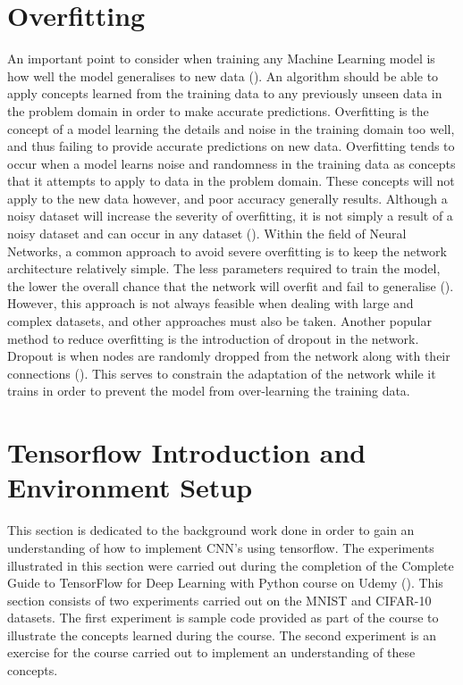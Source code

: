 \documentclass[12pt]{report}
\begin{document}
\section{Overfitting}
\begin{flushleft}
An important point to consider when training any Machine Learning model is how well the model generalises to new data (\cite{domingos2012few}). An algorithm should be able to apply concepts learned from the training data to any previously unseen data in the problem domain in order to make accurate predictions. Overfitting is the concept of a model learning the details and noise in the training domain too well, and thus failing to provide accurate predictions on new data. Overfitting tends to occur when a model learns noise and randomness in the training data as concepts that it attempts to apply to data in the problem domain. These concepts will not apply to the new data however, and poor accuracy generally results. Although a noisy dataset will increase the severity of overfitting, it is not simply a result of a noisy dataset and can occur in any dataset (\cite{domingos2012few}). Within the field of Neural Networks, a common approach to avoid severe overfitting is to keep the network architecture relatively simple. The less parameters required to train the model, the lower the overall chance that the network will overfit and fail to generalise (\cite{o2015introduction}). However, this approach is not always feasible when dealing with large and complex datasets, and other approaches must also be taken. Another popular method to reduce overfitting is the introduction of dropout in the network. Dropout is when nodes are randomly dropped from the network along with their connections (\cite{srivastava2014dropout}). This serves to constrain the adaptation of the network while it trains in order to prevent the model from over-learning the training data.
\end{flushleft}

\newpage
\section{Tensorflow Introduction and Environment Setup}

This section is dedicated to the background work done in order to gain an understanding of how to implement CNN's using tensorflow. The experiments illustrated in this section were carried out during the completion of the Complete Guide to TensorFlow for Deep Learning with Python course on Udemy (\cite{udemy}). This section consists of two experiments carried out on the MNIST and CIFAR-10 datasets. The first experiment is sample code provided as part of the course to illustrate the concepts learned during the course. The second experiment is an exercise for the course carried out to implement an understanding of these concepts.
\end{document}
